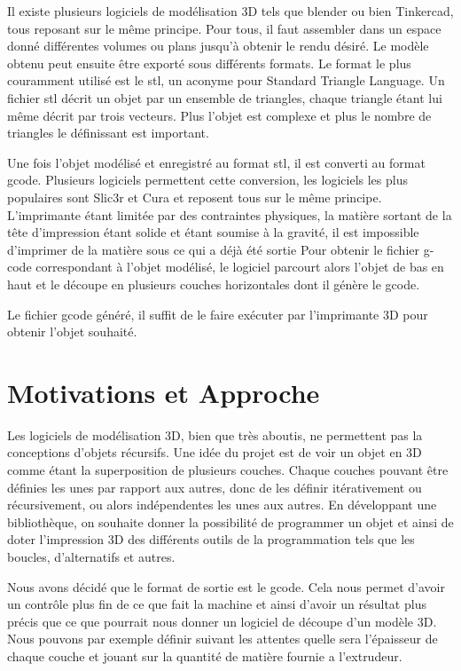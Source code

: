 \documentclass[11pt, titlepage]{article}
\begin{document}
Il existe plusieurs logiciels de modélisation 3D tels que blender ou bien Tinkercad, tous reposant sur le même principe. Pour tous, il faut assembler dans un espace donné différentes volumes ou plans jusqu'à obtenir le rendu désiré. Le modèle obtenu peut ensuite être exporté sous différents formats. Le format le plus couramment utilisé est le stl, un aconyme pour Standard Triangle Language. Un fichier stl décrit un objet par un ensemble de triangles, chaque triangle étant lui même décrit par trois vecteurs. Plus l'objet est complexe et plus le nombre de triangles le définissant est important.

Une fois l'objet modélisé et enregistré au format stl, il est converti au format gcode.
Plusieurs logiciels permettent cette conversion, les logiciels les plus populaires sont Slic3r et Cura et reposent tous sur le même principe.
L'imprimante étant limitée par des contraintes physiques, la matière sortant de la tête d'impression étant solide et étant soumise à la gravité, il est impossible d'imprimer de la matière sous ce qui a déjà été sortie 
Pour obtenir le fichier g-code correspondant à l'objet modélisé, le logiciel parcourt alors l'objet de bas en haut et le découpe en plusieurs couches horizontales dont il génère le gcode.

Le fichier gcode généré, il suffit de le faire exécuter par l'imprimante 3D pour obtenir l'objet souhaité.

\newpage
\section{Motivations et Approche}
Les logiciels de modélisation 3D, bien que très aboutis, ne permettent pas la conceptions d’objets récursifs.
Une idée du projet est de voir un objet en 3D comme étant la superposition de plusieurs couches. Chaque couches pouvant être définies les unes par rapport aux autres, donc de les définir itérativement ou récursivement, ou alors indépendentes les unes aux autres.
En développant une bibliothèque, on souhaite donner la possibilité de programmer un objet et ainsi de doter l'impression 3D des différents outils de la programmation tels que les boucles, d'alternatifs et autres.

Nous avons décidé que le format de sortie est le gcode. Cela nous permet d'avoir un contrôle plus fin de ce que fait la machine et ainsi d'avoir un résultat plus précis que ce que pourrait nous donner un logiciel de découpe d'un modèle 3D.
Nous pouvons par exemple définir suivant les attentes quelle sera l'épaisseur de chaque couche et jouant sur la quantité de matière fournie a l'extrudeur.
\end{document}

